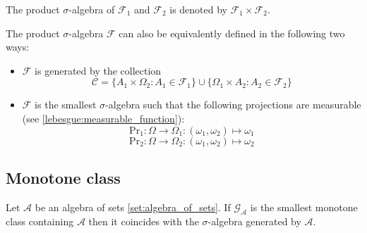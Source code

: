 	\begin{notation}
		The product $\sigma$-algebra of $\mathcal{F}_1$ and $\mathcal{F}_2$ is denoted by $\mathcal{F}_1\times\mathcal{F}_2$.
	\end{notation}
    
	\begin{adefinition}
		The product $\sigma$-algebra $\mathcal{F}$ can also be equivalently defined in the following two ways:
        	\begin{itemize}
			\item $\mathcal{F}$ is generated by the collection
	            		\[\mathcal{C} = \{A_1\times \Omega_2:A_1\in\mathcal{F}_1\}\cup\{\Omega_1\times A_2:A_2\in\mathcal{F}_2\}\]
		        \item $\mathcal{F}$ is the smallest $\sigma$-algebra such that the following projections are measurable (see \ref{lebesgue:measurable_function}):
			        \[\text{Pr}_1:\Omega\rightarrow\Omega_1:(\omega_1,\omega_2)\mapsto\omega_1\]
        	    		\[\text{Pr}_2:\Omega\rightarrow\Omega_2:(\omega_1,\omega_2)\mapsto\omega_2\]
		\end{itemize}
	\end{adefinition}
    
\subsection{Monotone class}
	

	\begin{theorem}\label{set:theorem:monotone_class}
		Let $\mathcal{A}$ be an algebra of sets \ref{set:algebra_of_sets}. If $\mathcal{G}_\mathcal{A}$ is the smallest monotone class containing $\mathcal{A}$ then it coincides with the $\sigma$-algebra generated by $\mathcal{A}$.
	\end{theorem}

